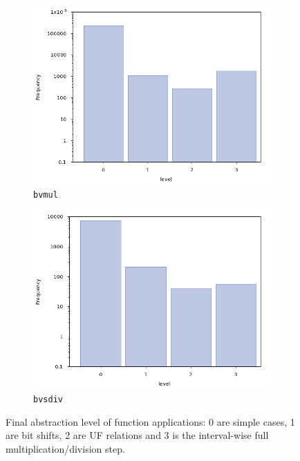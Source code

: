 \begin{figure}[ht]
    \begin{subfigure}[b]{0.5\textwidth}
        \centering
        \includegraphics[width=\textwidth]{plots/unsat/level-MulNode.png}
        \caption{\texttt{bvmul}}
    \end{subfigure}
    \hfill
    \begin{subfigure}[b]{0.5\textwidth}
        \centering
        \includegraphics[width=\textwidth]{plots/unsat/level-SdivNode.png}
        \caption{\texttt{bvsdiv}}
    \end{subfigure}
    \caption{Final abstraction level of function applications: 0 are simple cases, 1 are bit shifts, 2 are UF relations and 3 is the interval-wise full multiplication/division step.}
    \label{fig:evaluation:unsat:level}
\end{figure}

